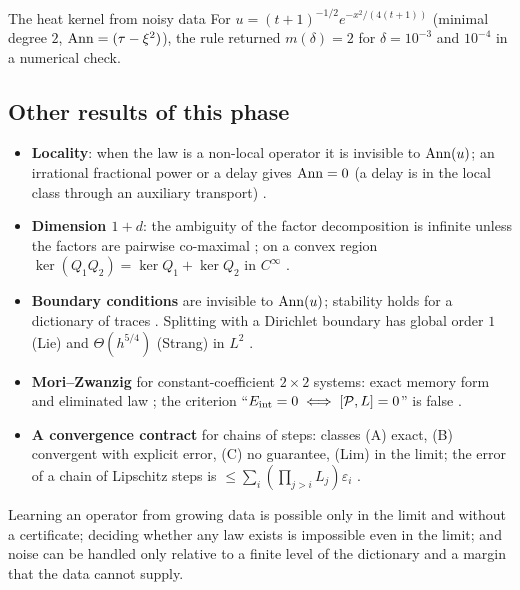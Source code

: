 \begin{example}{The heat kernel from noisy data}
For $u=(t+1)^{-1/2}e^{-x^2/(4(t+1))}$ (minimal degree $2$, $\operatorname{Ann}=(\tau-\xi^2)$), the rule returned $m(\delta)=2$ for $\delta=10^{-3}$ and $10^{-4}$ in a numerical check.
\end{example}

\subsection{Other results of this phase}

\begin{itemize}
\item \textbf{Locality}: when the law is a non-local operator it is invisible to $\operatorname{Ann}(u)$; an irrational fractional power or a delay gives $\operatorname{Ann}=0$ (a delay is in the local class through an auxiliary transport) .
\item \textbf{Dimension $1+d$}: the ambiguity of the factor decomposition is infinite unless the factors are pairwise co-maximal ; on a convex region $\ker(Q_1Q_2)=\ker Q_1+\ker Q_2$ in $C^\infty$ .
\item \textbf{Boundary conditions} are invisible to $\operatorname{Ann}(u)$; stability holds for a dictionary of traces . Splitting with a Dirichlet boundary has global order $1$ (Lie) and $\Theta(h^{5/4})$ (Strang) in $L^2$ .
\item \textbf{Mori--Zwanzig} for constant-coefficient $2\times2$ systems: exact memory form and eliminated law ; the criterion ``$E_{\rm int}=0\iff[\mathcal P,L]=0$'' is false .
\item \textbf{A convergence contract} for chains of steps: classes (A) exact, (B) convergent with explicit error, (C) no guarantee, (Lim) in the limit; the error of a chain of Lipschitz steps is $\le\sum_i(\prod_{j>i}L_j)\varepsilon_i$ .
\end{itemize}

\begin{takeaway}
Learning an operator from growing data is possible only in the limit and without a certificate; deciding whether any law exists is impossible even in the limit; and noise can be handled only relative to a finite level of the dictionary and a margin that the data cannot supply.
\end{takeaway}

